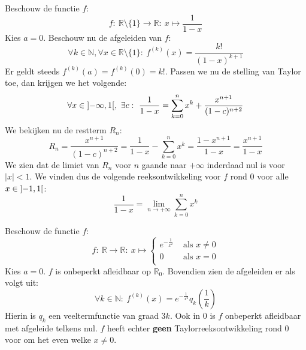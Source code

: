 \documentclass[main.tex]{subfiles}
\begin{document}
\begin{vb}
  Beschouw de functie $f$:
  \[ f:\ \mathbb{R} \setminus \{1\} \rightarrow \mathbb{R}:\ x \mapsto \frac{1}{1-x} \]
  Kies $a=0$.
  Beschouw nu de afgeleiden van $f$:
  \[ \forall k\in \mathbb{N}, \forall x\in \mathbb{R}\setminus\{1\}:\ f^{(k)}(x) = \frac{k!}{(1-x)^{k+1}} \]
  Er geldt steeds $f^{(k)}(a) = f^{(k)}(0) = k!$.
  Passen we nu de stelling van Taylor toe, dan krijgen we het volgende: 
  \[ \forall x\in \interval[open]{-\infty}{1},\ \exists c:\ \frac{1}{1-x} = \sum_{k=0}^{n}x^{k} + \frac{x^{n+1}}{(1-c)^{n+2}} \]
  We bekijken nu de restterm $R_{n}$:
  \[ R_{n} = \frac{x^{n+1}}{(1-c)^{n+2}} = \frac{1}{1-x}-\sum_{k=0}^{n}x^{k} = \frac{1-x^{n+1}}{1-x} = \frac{x^{n+1}}{1-x} \]
  We zien dat de limiet van $R_{n}$ voor $n$ gaande naar $+\infty$ inderdaad nul is voor $|x|<1$.
  We vinden dus de volgende reeksontwikkeling voor $f$ rond $0$ voor alle $x\in \interval[open]{-1}{1}$:
  \[ \frac{1}{1-x} = \lim_{n \rightarrow +\infty}\sum_{k=0}^{n}x^{k} \]
  \begin{figure}[H]
    \centering
  \end{figure}
\end{vb}

\begin{vb}
  Beschouw de functie $f$:
  \[ 
  f:\ \mathbb{R} \rightarrow \mathbb{R}:\ x \mapsto 
  \left\{
    \begin{array}{rl}
      e^{-\frac{1}{x^{2}}} & \text{ als } x \neq 0\\
      0 & \text{ als } x = 0\\
    \end{array}
  \right.
  \]
  Kies $a=0$.
  $f$ is onbeperkt afleidbaar op $\mathbb{R}_{0}$.\waarom
  Bovendien zien de afgeleiden er als volgt uit:
  \[ \forall k\in \mathbb{N}:\ f^{(k)}(x) = e^{-\frac{1}{x^{2}}}q_{k}\left(\frac{1}{k}\right) \]
  Hierin is $q_{k}$ een veeltermfunctie van graad $3k$.
  Ook in $0$ is $f$ onbeperkt afleidbaar met afgeleide telkens nul.
  $f$ heeft echter \textbf{geen} Taylorreeksontwikkeling rond $0$ voor om het even welke $x \neq 0$. 
\end{vb}
\end{document}
